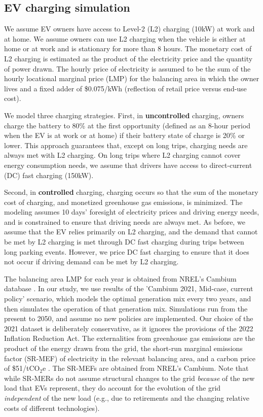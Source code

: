 \documentclass[11pt,preprint]{elsarticle}
\begin{document}
\subsection{EV charging simulation}

We assume EV owners have access to Level-2 (L2) charging (10kW) at work and at home. We assume owners can use L2 charging when the vehicle is either at home or at work and is stationary for more than 8 hours. The monetary cost of L2 charging is estimated as the product of the electricity price and the quantity of power drawn. The hourly price of electricity is assumed to be the sum of the hourly locational marginal price (LMP) for the balancing area in which the owner lives and a fixed adder of \$0.075/kWh (reflection of retail price versus end-use cost)\cite{gagnon_cambium_2021}. 

We model three charging strategies. First, in \textbf{uncontrolled} charging, owners charge the battery to 80\% at the first opportunity (defined as an 8-hour period when the EV is at work or at home) if their battery state of charge is 20\% or lower. This approach guarantees that, except on long trips, charging needs are always met with L2 charging. On long trips where L2 charging cannot cover energy consumption needs, we assume that drivers have access to direct-current (DC) fast charging (150kW). 

Second, in \textbf{controlled} charging, charging occurs so that the sum of the monetary cost of charging, and monetized greenhouse gas emissions, is minimized. The modeling assumes 10 days' foresight of electricity prices and driving energy needs, and is constrained to ensure that driving needs are always met. As before, we assume that the EV relies primarily on L2 charging, and the demand that cannot be met by L2 charging is met through DC fast charging during trips between long parking events. However, we price DC fast charging to ensure that it does not occur if driving demand can be met by L2 charging. 

The balancing area LMP for each year is obtained from NREL's Cambium database \cite{gagnon_cambium_2021}. In our study, we use results of the 'Cambium 2021, Mid-case, current policy' scenario, which models the optimal generation mix every two years, and then simulates the operation of that generation mix. Simulations run from the present to 2050, and assume no new policies are implemented. Our choice of the 2021 dataset is deliberately conservative, as it ignores the provisions of the 2022 Inflation Reduction Act. The externalities from greenhouse gas emissions are the product of the energy drawn from the grid, the short-run marginal emissions factor (SR-MEF) of electricity in the relevant balancing area, and a carbon price of \$51/tCO$_2$e \cite{noauthor_technical_2021}. The SR-MEFs are obtained from NREL's Cambium. Note that while SR-MERs do not assume structural changes to the grid \textit{because} of the new load that EVs represent, they do account for the evolution of the grid \textit{independent} of the new load (e.g., due to retirements and the changing relative costs of different technologies).
\end{document}
